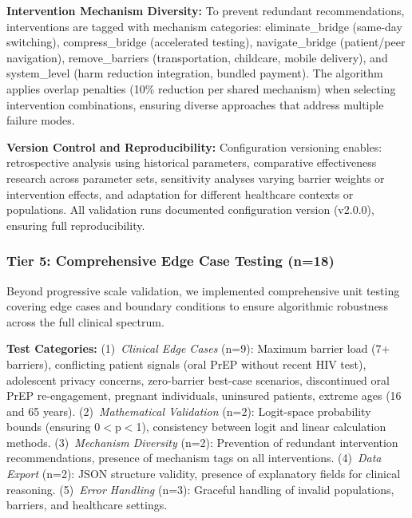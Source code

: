 \textbf{Intervention Mechanism Diversity:} To prevent redundant recommendations, interventions are tagged with mechanism categories: eliminate\_bridge (same-day switching), compress\_bridge (accelerated testing), navigate\_bridge (patient/peer navigation), remove\_barriers (transportation, childcare, mobile delivery), and system\_level (harm reduction integration, bundled payment). The algorithm applies overlap penalties (10\% reduction per shared mechanism) when selecting intervention combinations, ensuring diverse approaches that address multiple failure modes.

\textbf{Version Control and Reproducibility:} Configuration versioning enables: retrospective analysis using historical parameters, comparative effectiveness research across parameter sets, sensitivity analyses varying barrier weights or intervention effects, and adaptation for different healthcare contexts or populations. All validation runs documented configuration version (v2.0.0), ensuring full reproducibility.



\subsubsection{Tier 5: Comprehensive Edge Case Testing (n=18)}

Beyond progressive scale validation, we implemented comprehensive unit testing covering edge cases and boundary conditions to ensure algorithmic robustness across the full clinical spectrum.

\textbf{Test Categories:} (1)~\textit{Clinical Edge Cases} (n=9): Maximum barrier load (7+ barriers), conflicting patient signals (oral PrEP without recent HIV test), adolescent privacy concerns, zero-barrier best-case scenarios, discontinued oral PrEP re-engagement, pregnant individuals, uninsured patients, extreme ages (16 and 65 years). (2)~\textit{Mathematical Validation} (n=2): Logit-space probability bounds (ensuring 0$<$p$<$1), consistency between logit and linear calculation methods. (3)~\textit{Mechanism Diversity} (n=2): Prevention of redundant intervention recommendations, presence of mechanism tags on all interventions. (4)~\textit{Data Export} (n=2): JSON structure validity, presence of explanatory fields for clinical reasoning. (5)~\textit{Error Handling} (n=3): Graceful handling of invalid populations, barriers, and healthcare settings.

